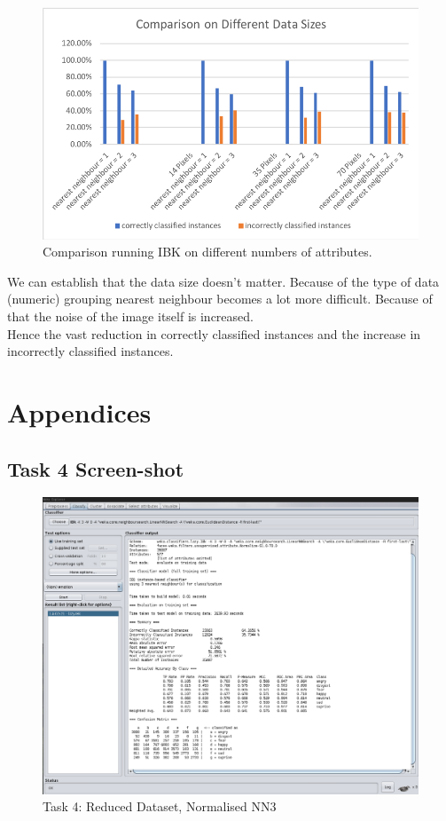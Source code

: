 \documentclass[12pt]{article}
\begin{document}
\begin{figure}[H]
	\centering
	\includegraphics[width=0.7\linewidth]{images/masters2}
	\caption{Comparison running IBK on different numbers of attributes.}
	\label{fig:masters2}
\end{figure}

We can establish that the data size doesn't matter. Because of the type of data (numeric) grouping nearest neighbour becomes a lot more difficult. Because of that the noise of the image itself is increased.\\

Hence the vast reduction in correctly classified instances and the increase in incorrectly classified instances.\\

\newpage
\printbibliography

\newpage
\section{Appendices}

\subsection{Task 4 Screen-shot}

\begin{figure}[H]
	\centering
	\includegraphics[width=1\linewidth]{images/task4_1}
	\caption{Task 4: Reduced Dataset, Normalised NN3}
	\label{fig:task4_1}
\end{figure}
\end{document}

